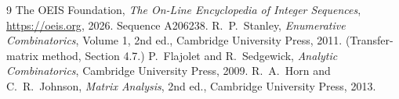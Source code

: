 \documentclass[11pt,a4paper]{article}
\theoremstyle{plain}
\theoremstyle{definition}
\begin{document}
\begin{thebibliography}{9}
 The OEIS Foundation, \emph{The On-Line Encyclopedia of Integer
Sequences}, \url{https://oeis.org}, 2026. Sequence A206238.
 R.~P.~Stanley, \emph{Enumerative Combinatorics}, Volume 1, 2nd ed.,
Cambridge University Press, 2011. (Transfer-matrix method, Section 4.7.)
 P.~Flajolet and R.~Sedgewick, \emph{Analytic Combinatorics}, Cambridge
University Press, 2009.
 R.~A.~Horn and C.~R.~Johnson, \emph{Matrix Analysis}, 2nd ed., Cambridge
University Press, 2013.
\end{thebibliography}
\end{document}
